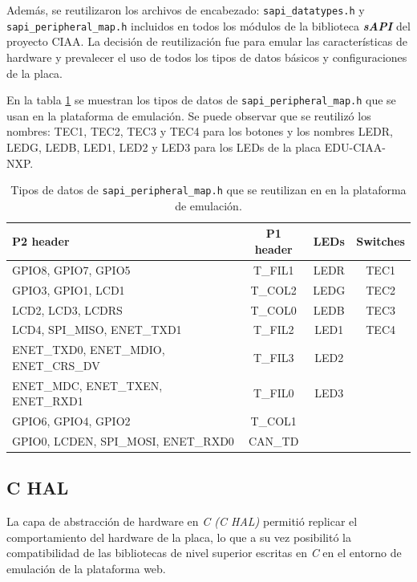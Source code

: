 Además, se reutilizaron los archivos de encabezado: \texttt{sapi\_datatypes.h} y \newline \texttt{sapi\_peripheral\_map.h} incluidos en todos los módulos de la biblioteca \textit{\textbf{sAPI}} del proyecto CIAA. La decisión de reutilización fue para emular las características de hardware y prevalecer el uso de todos los tipos de datos básicos y configuraciones de la placa.

En la tabla \ref{tab:ConfiguracionGPIO} se muestran los tipos de datos de \texttt{sapi\_peripheral\_map.h} que se usan en la plataforma de emulación. Se puede observar que se reutilizó los nombres: TEC1, TEC2, TEC3 y TEC4 para los botones y los nombres LEDR, LEDG, LEDB, LED1, LED2 y LED3 para los LEDs de la placa EDU-CIAA-NXP.

\begin{table}[h]
	\centering
	\caption[\texttt{sapi\_peripheral\_map.h}.]{Tipos de datos de \texttt{sapi\_peripheral\_map.h} que se reutilizan en en la plataforma de emulación.}
	\begin{tabular}{l c c c}    
		\toprule
		\textbf{P2 header} & \textbf{P1 header} & \textbf{LEDs}  & \textbf{Switches}\\
		\midrule
		GPIO8, GPIO7, GPIO5 & T\_FIL1 &  LEDR &  TEC1\\		
		GPIO3, GPIO1, LCD1 & T\_COL2  & LEDG &  TEC2\\
		LCD2, LCD3, LCDRS & T\_COL0 & LEDB &  TEC3\\
		LCD4, SPI\_MISO, ENET\_TXD1 & T\_FIL2 & LED1 & TEC4\\
		ENET\_TXD0, ENET\_MDIO, ENET\_CRS\_DV & T\_FIL3 & LED2 & \\
	    ENET\_MDC, ENET\_TXEN, ENET\_RXD1 & T\_FIL0 & LED3 & \\
	    GPIO6, GPIO4, GPIO2 & T\_COL1&  & \\
	    GPIO0, LCDEN, SPI\_MOSI, ENET\_RXD0 & CAN\_TD&  & \\
		\bottomrule
		\hline
	\end{tabular}
	\label{tab:ConfiguracionGPIO}
\end{table}






\subsection{C HAL}

La capa de abstracción de hardware en \textit{C (C HAL)}  permitió replicar el comportamiento del hardware de la placa, lo que a su vez posibilitó la compatibilidad de las bibliotecas de nivel superior escritas en \textit{C} en el entorno de emulación de la plataforma web.

